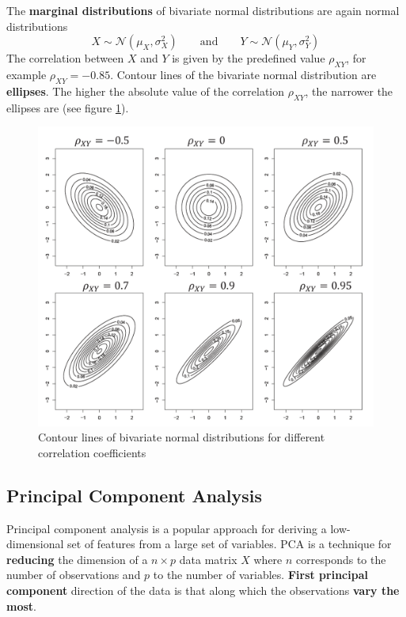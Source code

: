 \documentclass[11pt]{article}
\theoremstyle{definition}
\newcommand*\N[1]{\mathcal{N}\left(#1\right)}
\begin{document}
The \textbf{marginal distributions} of bivariate normal distributions are again normal distributions
\begin{equation*}
	X\sim\N{\mu_X,\sigma_X^2}\qquad\text{and}\qquad Y\sim\N{\mu_Y,\sigma_Y^2}
\end{equation*}
The correlation between $X$ and $Y$ is given by the predefined value $\rho_{XY}$, for example $\rho_{XY} = -0.85$. Contour lines of the bivariate normal distribution are \textbf{ellipses}. The higher the absolute value of the correlation $\rho_{XY}$, the narrower the ellipses are (see figure \ref{fig:correlationcontourlines}).

\begin{figure}[tbh]
	\centering
	\includegraphics[width=0.6\linewidth]{img/correlation_contour_lines}
	\caption{Contour lines of bivariate normal distributions for different correlation coefficients}
	\label{fig:correlationcontourlines}
\end{figure}

\subsection{Principal Component Analysis}
Principal component analysis is a popular approach for deriving a low-dimensional set of features from a large set of variables.
PCA is a technique for \textbf{reducing} the dimension of a $n \times p$ data matrix $X$ where $n$ corresponds to the number of observations and $p$ to the number of variables.
\textbf{First principal component} direction of the data is that along which the observations \textbf{vary the most}.
\end{document}
